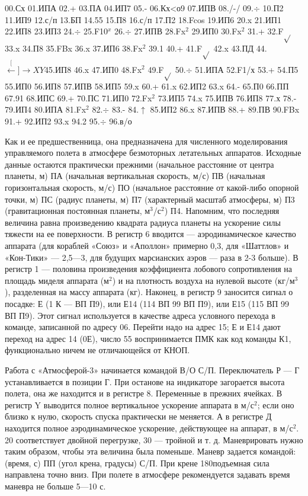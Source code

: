 \documentclass[11pt,a4paper,oneside]{article}
\def\XY{$\stackrel[\leftarrow]{\rightarrow}{XY}$}
\begin{document}
00.Сх 01.ИПА 02.+ 03.ПА 04.ИП7 05.- 06.Кх<о9 07.ИПВ 08./-/ 09.$\div$ 10.П2 11.ИП9 12.с/п 13.БП 14.55 15.П8 16.с/п 17.П2
18.Fcos 19.ИП6 20.x 21.ИП1 22.ИП8 23.ИП3 24.$\div$
25.F10$^{x}$ 26.$\div$ 27.ИПВ 28.Fx$^{2}$ 29.ИП0 30.Fx$^{2}$ 31.+ 32.F$\sqrt{}$
33.x 34.П8 35.FBx 36.x 37.ИП6 38.Fx$^{2}$ 39.1 40.+ 41.F$\sqrt{}$ 42.x 43.ПД 44.\XY 45.ИП8 46.x 47.ИП0 48.Fx$^{2}$ 49.F$\sqrt{}$
50.$\div$ 51.ИПА 52.F1/х 53.+ 54.П5 55.ИП0 56.ИП8
57.ИПВ 58.ИП5 59.x 60.+ 61.x 62.ИП2 63.x 64.-
65.П0 66.ПП 67.91 68.ИПС 69.+ 70.ПС 71.ИП0
72.Fx$^{2}$ 73.ИП5 74.x 75.ИПВ 76.ИП8 77.х 78.- 79.ИП4
80.ИПА 81.Fx$^{2}$ 82.$\div$ 83.- 84.$\uparrow$ 85.ИП2 86.x 87.ИПВ 88.+ 89.ПВ 90.FBx 91.+ 92.ИП2 93.x 94.2 95.$\div$ 96.в/о

Как и ее предшественница, она предназначена для численного моделирования управляемого полета в атмосфере безмоторных летательных аппаратов. Исходные данные остаются практически прежними (начальное расстояние от центра планеты, м) ПА (начальная вертикальная скорость, м/с) ПВ (начальная горизонтальная скорость, м/с) ПО (начальное расстояние от какой-либо опорной точки, м) ПС (радиус планеты, м) П7 (характерный масштаб атмосферы, м) П3 (гравитационная постоянная планеты, м$^{3}$/с$^{2}$) П4. Напомним, что последняя величина равна произведению квадрата радиуса планеты на ускорение силы тяжести на ее поверхности. В регистр 6 вводится — аэродинамическое качество аппарата (для кораблей «Союз» и «Аполлон» примерно 0,3, для «Шаттлов» и «Кон-Тики» — 2,5—3, для будущих марсианских аэров — раза в 2-3 больше). В регистр 1 — половина произведения коэффициента лобового сопротивления на площадь миделя аппарата (м$^{2}$) и на плотность воздуха на нулевой высоте (кг/м$^{3}$), разделенная на массу аппарата (кг). Наконец, в регистр 9 заносится сигнал о посадке: Е (1 К — ВП П9), или Е14 (114 ВП 99 ВП П9), или Е15 (115 ВП 99 ВП П9). Этот сигнал используется в качестве адреса условного перехода в команде, записанной по адресу 06. Перейти надо на адрес 15; Е и Е14 дают переход на адрес 14 (0Е), число 55 воспринимается ПМК как код команды К1, функционально ничем не отличающейся от КНОП.

Работа с «Атмосферой-3» начинается командой В/О С/П. Переключатель Р — Г устанавливается в позиции Г. При останове на индикаторе загорается высота полета, она же находится и в регистре 8. Переменные в прежних ячейках. В регистр Y выводится полное вертикальное ускорение аппарата в м/с$^{2}$; если оно близко к нулю, скорость спуска практически не меняется. А в регистре Д находится полное аэродинамическое ускорение, действующее на аппарат, в м/с$^{2}$. 20 соответствует двойной перегрузке, 30 — тройной и т. д. Маневрировать нужно таким образом, чтобы эта величина была поменьше. Маневр задается командой: (время, с) ПП (угол крена, градусы) С/П. При крене 180\degree подъемная сила направлена точно вниз. При полете в атмосфере рекомендуется задавать время маневра не больше 5—10 с.
\end{document}
